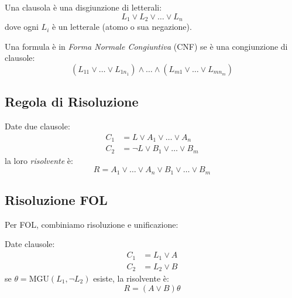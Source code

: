 \begin{definizione}[Clausola]
Una clausola è una disgiunzione di letterali:
\begin{equation}
L_1 \lor L_2 \lor \ldots \lor L_n
\end{equation}
dove ogni $L_i$ è un letterale (atomo o sua negazione).
\end{definizione}

\begin{definizione}[CNF]
Una formula è in \textit{Forma Normale Congiuntiva} (CNF) se è una congiunzione di clausole:
\begin{equation}
(L_{11} \lor \ldots \lor L_{1n_1}) \land \ldots \land (L_{m1} \lor \ldots \lor L_{mn_m})
\end{equation}
\end{definizione}

\subsection{Regola di Risoluzione}

\begin{teorema}
Date due clausole:
\begin{align}
C_1 &= L \lor A_1 \lor \ldots \lor A_n \\
C_2 &= \neg L \lor B_1 \lor \ldots \lor B_m
\end{align}
la loro \textit{risolvente} è:
\begin{equation}
R = A_1 \lor \ldots \lor A_n \lor B_1 \lor \ldots \lor B_m
\end{equation}
\end{teorema}

\subsection{Risoluzione FOL}

Per FOL, combiniamo risoluzione e unificazione:

\begin{teorema}
Date clausole:
\begin{align}
C_1 &= L_1 \lor A \\
C_2 &= L_2 \lor B
\end{align}
se $\theta = \text{MGU}(L_1, \neg L_2)$ esiste, la risolvente è:
\begin{equation}
R = (A \lor B)\theta
\end{equation}
\end{teorema}

